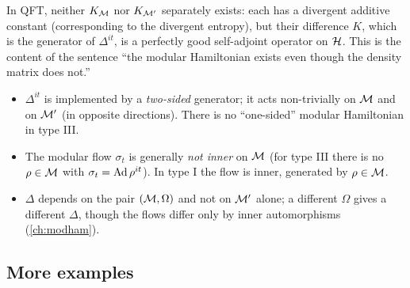 In QFT, neither $K_{\mathcal{M}}$ nor $K_{\mathcal{M}'}$ separately exists: each has a divergent additive constant (corresponding to the divergent entropy), but their difference $K$, which is the generator of $\Delta^{it}$, is a perfectly good self-adjoint operator on $\mathcal{H}$. This is the content of the sentence ``the modular Hamiltonian exists even though the density matrix does not.''

\begin{whatwrong}
\begin{itemize}
\item $\Delta^{it}$ is implemented by a \emph{two-sided} generator; it acts non-trivially on $\mathcal{M}$ and on $\mathcal{M}'$ (in opposite directions). There is no ``one-sided'' modular Hamiltonian in type III.
\item The modular flow $\sigma_t$ is generally \emph{not inner} on $\mathcal{M}$ (for type III there is no $\rho\in\mathcal{M}$ with $\sigma_t=\operatorname{Ad}\rho^{it}$). In type I the flow is inner, generated by $\rho\in\mathcal{M}$.
\item $\Delta$ depends on the pair $(\mathcal{M},\Omega)$ and not on $\mathcal{M}'$ alone; a different $\Omega$ gives a different $\Delta$, though the flows differ only by inner automorphisms (\cref{ch:modham}).
\end{itemize}
\end{whatwrong}

\subsection{More examples}

